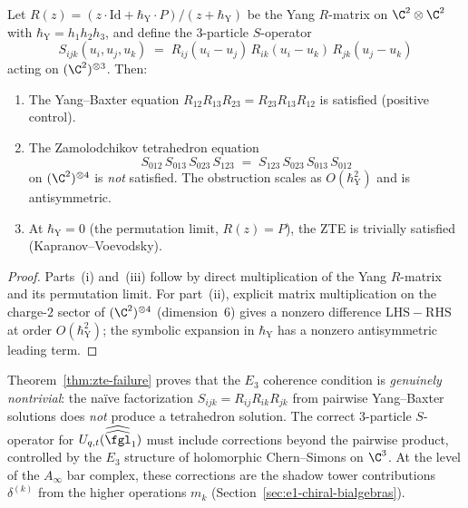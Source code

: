 \begin{theorem}
\label{thm:zte-failure}
Let $R(z) = (z \cdot \mathrm{Id} + \hbar_{\mathrm{Y}} \cdot P)/(z + \hbar_{\mathrm{Y}})$ be the Yang $R$-matrix on $\C^2 \otimes \C^2$ with $\hbar_{\mathrm{Y}} = h_1 h_2 h_3$, and define the $3$-particle $S$-operator
\[
 S_{ijk}(u_i, u_j, u_k) \;=\; R_{ij}(u_i - u_j) \, R_{ik}(u_i - u_k) \, R_{jk}(u_j - u_k)
\]
acting on $(\C^2)^{\otimes 3}$. Then:
\begin{enumerate}[label=\textup{(\roman*)}]
 \item The Yang--Baxter equation $R_{12} R_{13} R_{23} = R_{23} R_{13} R_{12}$ is satisfied (positive control).
 \item The Zamolodchikov tetrahedron equation
 \[
 S_{012} \, S_{013} \, S_{023} \, S_{123}
 \;=\;
 S_{123} \, S_{023} \, S_{013} \, S_{012}
 \]
 on $(\C^2)^{\otimes 4}$ is \emph{not} satisfied. The obstruction scales as $O(\hbar_{\mathrm{Y}}^2)$ and is antisymmetric.
 \item At $\hbar_{\mathrm{Y}} = 0$ (the permutation limit, $R(z) = P$), the ZTE is trivially satisfied (Kapranov--Voevodsky).
\end{enumerate}
\end{theorem}

\begin{proof}
Parts~(i) and~(iii) follow by direct multiplication of the Yang
$R$-matrix and its permutation limit. For part~(ii), explicit matrix
multiplication on the charge-$2$ sector of $(\C^2)^{\otimes 4}$
(dimension~$6$) gives a nonzero difference
$\mathrm{LHS}-\mathrm{RHS}$ at order $O(\hbar_{\mathrm{Y}}^2)$; the
symbolic expansion in $\hbar_{\mathrm{Y}}$ has a nonzero antisymmetric
leading term.
\end{proof}

\begin{remark}
\label{rem:zte-consequence}
Theorem~\ref{thm:zte-failure} proves that the $E_3$ coherence condition is \emph{genuinely nontrivial}: the na\"ive factorization $S_{ijk} = R_{ij} R_{ik} R_{jk}$ from pairwise Yang--Baxter solutions does \emph{not} produce a tetrahedron solution. The correct $3$-particle $S$-operator for $U_{q,t}(\widehat{\widehat{\fgl}}_1)$ must include corrections beyond the pairwise product, controlled by the $E_3$ structure of holomorphic Chern--Simons on $\C^3$. At the level of the $A_\infty$ bar complex, these corrections are the shadow tower contributions $\delta^{(k)}$ from the higher operations $m_k$ (Section~\ref{sec:e1-chiral-bialgebras}).
\end{remark}

